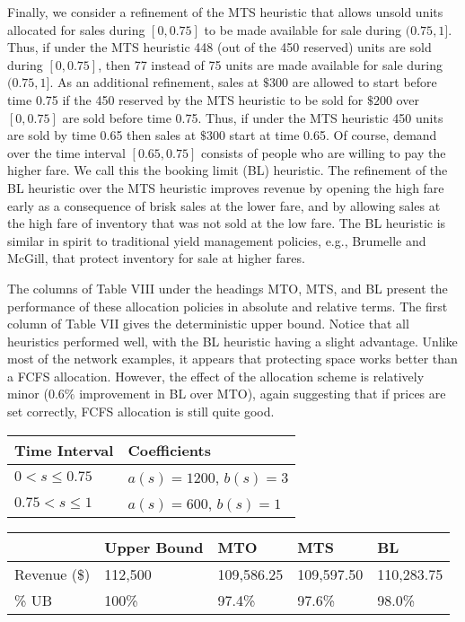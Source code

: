 Finally, we consider a refinement of the MTS heuristic that allows unsold units allocated for sales during \([0, 0.75]\) to be made available for sale during \((0.75, 1]\). Thus, if under the MTS heuristic 448 (out of the 450 reserved) units are sold during \([0, 0.75]\), then 77 instead of 75 units are made available for sale during \((0.75, 1]\). As an additional refinement, sales at \(\$300\) are allowed to start before time 0.75 if the 450 reserved by the MTS heuristic to be sold for \(\$200\) over \([0, 0.75]\) are sold before time 0.75. Thus, if under the MTS heuristic 450 units are sold by time 0.65 then sales at \(\$300\) start at time 0.65. Of course, demand over the time interval \([0.65, 0.75]\) consists of people who are willing to pay the higher fare. We call this the booking limit (BL) heuristic. The refinement of the BL heuristic over the MTS heuristic improves revenue by opening the high fare early as a consequence of brisk sales at the lower fare, and by allowing sales at the high fare of inventory that was not sold at the low fare. The BL heuristic is similar in spirit to traditional yield management policies, e.g., Brumelle and McGill, that protect inventory for sale at higher fares.

The columns of Table VIII under the headings MTO, MTS, and BL present the performance of these allocation policies in absolute and relative terms. The first column of Table VII gives the deterministic upper bound. Notice that all heuristics performed well, with the BL heuristic having a slight advantage. Unlike most of the network examples, it appears that protecting space works better than a FCFS allocation. However, the effect of the allocation scheme is relatively minor (\(0.6\%\) improvement in BL over MTO), again suggesting that if prices are set correctly, FCFS allocation is still quite good.

\begin{longtable}{|l|l|}
\hline
\textbf{Time Interval} & \textbf{Coefficients} \\
\hline
\(0 < s \leq 0.75\) & \(a(s) = 1200\), \(b(s) = 3\) \\
\hline
\(0.75 < s \leq 1\) & \(a(s) = 600\), \(b(s) = 1\) \\
\hline
\end{longtable}

\begin{longtable}{|l|l|l|l|l|}
\hline
& \textbf{Upper Bound} & \textbf{MTO} & \textbf{MTS} & \textbf{BL} \\
\hline
Revenue (\$) & 112,500 & 109,586.25 & 109,597.50 & 110,283.75 \\
\hline
\% UB & 100\% & 97.4\% & 97.6\% & 98.0\% \\
\hline
\end{longtable}

